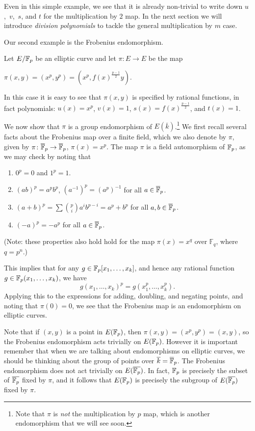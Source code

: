 Even in this simple example, we see that it is already non-trivial to write down $u$,~$v$,~$s$, and $t$ for the multiplication by $2$ map. In the next section we will introduce \emph{division polynomials} to tackle the general multiplication by $m$ case.

Our second example is the Frobenius endomorphism.
\begin{ex}\label{ex:frob-end}
Let $E/\mathbb{F}_p$ be an elliptic curve and let $\pi\colon E \rightarrow E$ be the map
\begin{center}$\pi (x,y) = (x^p,y^p) = (x^p, f(x)^{\frac{p-1}{2}}y)$.
\end{center}
In this case it is easy to see that $\pi(x,y)$ is specified by rational functions, in fact polynomials: $u(x) = x^p$, $v(x) = 1$, $s(x) =  f(x)^{\frac{p-1}{2}}$, and $t(x) = 1$.

We now show that $\pi$ is a group endomorphism of $E(\overline{k})$.\footnote{Note that $\pi$ is \emph{not} the multiplication by $p$ map, which is another endomorphism that we will see soon.}
We first recall several facts about the Frobenius map over a finite field, which we also denote by $\pi$, given by $\pi\colon \overline{\mathbb{F}}_p \rightarrow \overline{\mathbb{F}}_p$, $\pi(x) = x^p$. The map $\pi$ is a field automorphism of $\mathbb{F}_p$, as we may check by noting that
\begin{enumerate}
\item $0^p=0$ and $1^p=1$.
\item$(ab)^p = a^pb^p$, $(a^{-1})^p = (a^p)^{-1}$ for all $a\in \overline{\mathbb{F}}_p$.
\item$(a+b)^p = \sum {p \choose i} a^ib^{p-i} = a^p+b^p$ for all $a,b\in \overline{\mathbb{F}}_p$.
\item$(-a)^p = -a^p$  for all $a\in \overline{\mathbb{F}}_p$.
\end{enumerate}
(Note: these properties also hold hold for the map $\pi(x)=x^q$ over $\mathbb{F}_q$, where $q = p^n$.)

This implies that for any $g \in \mathbb{F}_p[x_1,\ldots,x_k]$, and hence any rational function $g \in \mathbb{F}_p(x_1,\ldots,x_k)$, we have
\[
g(x_1,\ldots,x_k)^p = g(x_1^p,\ldots,x_k^p).
\]
Applying this to the expressions for adding, doubling, and negating points, and noting that $\pi(0)=0$, we see that the Frobenius map is an endomorphism on elliptic curves.
\end{ex}

Note that if $(x,y)$ is a point in $E(\mathbb{F}_p)$, then $\pi(x,y)=(x^p,y^p)=(x,y)$, so the Frobenius endomorphism acts trivially on $E(\mathbb{F}_p)$.
However it is important remember that when we are talking about endomorphisms on elliptic curves, we should be thinking about the group of points over $\overline{k} = \overline{\mathbb{F}}_p$.  The Frobenius endomorphism does not act trivially on $E(\overline{\mathbb{F}_p})$.
In fact, $\mathbb{F}_p$ is precisely the subset of $\overline{\mathbb{F}_p}$ fixed by $\pi$, and it follows that $E(\mathbb{F}_p)$ is precisely the subgroup of $E(\overline{\mathbb{F}_p})$ fixed by $\pi$.

